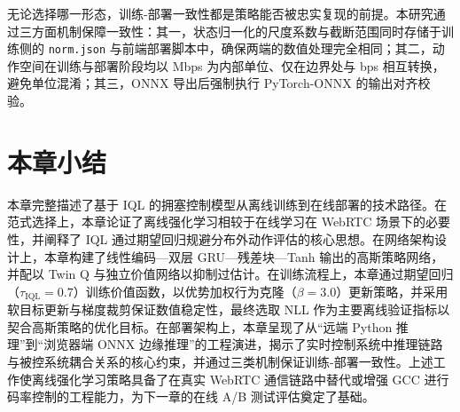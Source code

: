 无论选择哪一形态，训练-部署一致性都是策略能否被忠实复现的前提。本研究通过三方面机制保障一致性：其一，状态归一化的尺度系数与截断范围同时存储于训练侧的 \texttt{norm.json} 与前端部署脚本中，确保两端的数值处理完全相同；其二，动作空间在训练与部署阶段均以 Mbps 为内部单位、仅在边界处与 bps 相互转换，避免单位混淆；其三，ONNX 导出后强制执行 PyTorch-ONNX 的输出对齐校验。

\section{本章小结}

本章完整描述了基于 IQL 的拥塞控制模型从离线训练到在线部署的技术路径。在范式选择上，本章论证了离线强化学习相较于在线学习在 WebRTC 场景下的必要性，并阐释了 IQL 通过期望回归规避分布外动作评估的核心思想。在网络架构设计上，本章构建了线性编码—双层 GRU—残差块—Tanh 输出的高斯策略网络，并配以 Twin Q 与独立价值网络以抑制过估计。在训练流程上，本章通过期望回归（$\tau_{\text{IQL}}=0.7$）训练价值函数，以优势加权行为克隆（$\beta=3.0$）更新策略，并采用软目标更新与梯度裁剪保证数值稳定性，最终选取 NLL 作为主要离线验证指标以契合高斯策略的优化目标。在部署架构上，本章呈现了从“远端 Python 推理”到“浏览器端 ONNX 边缘推理”的工程演进，揭示了实时控制系统中推理链路与被控系统耦合关系的核心约束，并通过三类机制保证训练-部署一致性。上述工作使离线强化学习策略具备了在真实 WebRTC 通信链路中替代或增强 GCC 进行码率控制的工程能力，为下一章的在线 A/B 测试评估奠定了基础。
